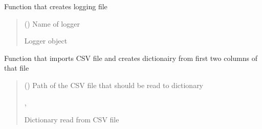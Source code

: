 \documentclass[letterpaper,10pt,english]{sphinxmanual}
\begin{document}
\begin{fulllineitems}
\label{\detokenize{geo_utilities:geo_utilities.create_logger}}
\pysigstartsignatures
{}
\pysigstopsignatures
\sphinxAtStartPar
Function that creates logging file
\begin{quote}\begin{description}
\sphinxAtStartPar
{} () \textendash{} Name of logger

\sphinxAtStartPar
{}

\sphinxAtStartPar
Logger object

\end{description}\end{quote}

\end{fulllineitems}


\begin{fulllineitems}
\label{\detokenize{geo_utilities:geo_utilities.csv_to_dict}}
\pysigstartsignatures
{}
\pysigstopsignatures
\sphinxAtStartPar
Function that imports CSV file and creates dictionairy from first two columns of that file
\begin{quote}\begin{description}
\sphinxAtStartPar
{} () \textendash{} Path of the CSV file that should be read to dictionary

\sphinxAtStartPar
\sphinxcode{\sphinxupquote{Dict}}{[}, \sphinxcode{\sphinxupquote{str}}{]}

\sphinxAtStartPar
Dictionary read from CSV file

\end{description}\end{quote}

\end{fulllineitems}
\end{document}
